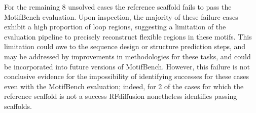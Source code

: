 For the remaining 8 unsolved cases the reference scaffold fails to pass the MotifBench evaluation.
Upon inspection, the majority of these failure cases exhibit a high proportion of loop regions, suggesting a limitation of the evaluation pipeline to precisely reconstruct flexible regions in these motifs.
This limitation could owe to the sequence design or structure prediction steps, and may be addressed by improvements in methodologies for these tasks, and could be incorporated into future versions of MotifBench.
However, this failure is not conclusive evidence for the impossibility of identifying successes for these cases even with the MotifBench evaluation; indeed, for 2 of the cases for which the reference scaffold is not a success RFdiffusion nonetheless identifies passing scaffolds.
